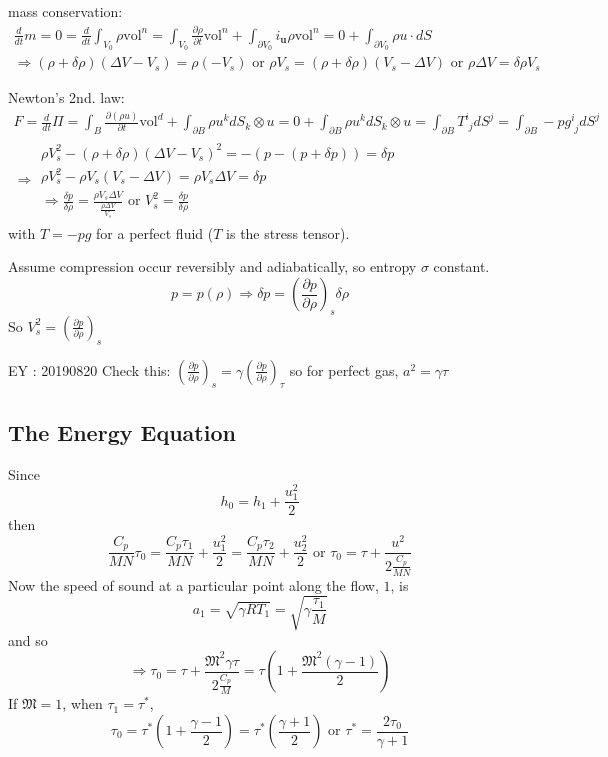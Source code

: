\documentclass[twoside,landscape,10pt]{amsart}
\theoremstyle{plain}
\theoremstyle{definition}
\theoremstyle{remark}
\theoremstyle{remark}
\begin{document}
\begin{multicols*}{2}
mass conservation:
\[
\begin{gathered}
\frac{d}{dt} m = 0 = \frac{d}{dt} \int_{V_0} \rho \text{vol}^n = \int_{V_0} \frac{ \partial \rho }{ \partial t} \text{vol}^n + \int_{\partial V_0} i_{\mathbf{u}} \rho \text{vol}^n = 0 + \int_{\partial V_0} \rho u \cdot dS \\ 
\Longrightarrow (\rho + \delta \rho) (\Delta V - V_s) = \rho (-V_s) \text{ or } \rho V_s = (\rho + \delta \rho) (V_s - \Delta V) \text{ or } \rho \Delta V = \delta \rho V_s
\end{gathered}
\]

Newton's 2nd. law:
\[
\begin{gathered}
F = \frac{d}{dt} \Pi = \int_B \frac{ \partial ( \rho u)}{ \partial t} \text{vol}^d + \int_{\partial B} \rho u^k dS_k \otimes u = 0 + \int_{\partial B} \rho u^k dS_k \otimes u = \int_{\partial B} T^i_{ \, \, j } dS^j = \int_{\partial B} - p g^i_{\, \, j} dS^j   \\
\Longrightarrow \begin{gathered}
\rho V_s^2 - (\rho + \delta \rho) (\Delta V - V_s)^2 = - ( p - (p + \delta p)) = \delta p \\ 
\rho V_s^2 - \rho V_s (V_s - \Delta V) = \rho V_s \Delta V = \delta p  \\
\Longrightarrow \frac{ \delta p }{ \delta \rho } = \frac{ \rho V_s \Delta V}{ \frac{ \rho \Delta V}{ V_s} } \text{ or } V_s^2 = \frac{ \delta p}{ \delta \rho} 
\end{gathered}
\end{gathered}
\]
with $T = -pg$ for a perfect fluid ($T$ is the stress tensor).

Assume compression occur reversibly and adiabatically, so entropy $\sigma$ constant. 
\[
p = p(\rho) \Longrightarrow \delta p = \left( \frac{ \partial p}{\partial \rho} \right)_s \delta \rho
\]
So $V_s^2 = \left( \frac{ \partial p }{ \partial \rho} \right)_s$

EY : 20190820 Check this: $\left( \frac{\partial p }{\partial \rho} \right)_s = \gamma \left( \frac{ \partial p }{\partial \rho} \right)_{\tau}$ so for perfect gas, $a^2 = \gamma \tau$



\subsection{The Energy Equation}

Since 
\[
h_0 = h_1 + \frac{u_1^2}{2}
\]
then
\[
\frac{C_p}{MN} \tau_0 = \frac{C_p \tau_1}{MN} + \frac{u_1^2}{2} = \frac{C_p \tau_2}{MN} + \frac{u_2^2}{2} \text{ or } \tau_0 = \tau + \frac{u^2}{ 2 \frac{C_p}{MN} }
\]
Now the speed of sound at a particular point along the flow, $1$, is 
\[
a_1 = \sqrt{ \gamma RT_1 } = \sqrt{ \gamma \frac{\tau_1}{M} }
\]
and so 
\[
\Longrightarrow \tau_0 = \tau + \frac{ \mathfrak{M}^2 \gamma \tau }{ 2 \frac{C_p}{M}} = \tau \left( 1 + \frac{ \mathfrak{M}^2 (\gamma-1) }{2} \right)
\]
If $\mathfrak{M}=1$, when $\tau_1=\tau^*$, 
\[
\tau_0 = \tau^* \left( 1 + \frac{\gamma -1}{2} \right) = \tau^* \left( \frac{\gamma + 1 }{2} \right)
\text{ or } \tau^* = \frac{ 2\tau_0 }{ \gamma + 1 } 
\]


\end{multicols*}
\end{document}

